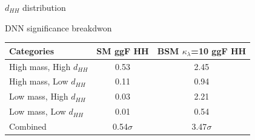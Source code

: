 \begin{frame}{$d_{HH}$ distribution}
\begin{figure}
    \centering
\end{figure}    
\end{frame}

\begin{frame}{DNN significance breakdwon}
\begin{table}[htbp]
    \centering
    \begin{tabular}{lcc}
        \hline\hline
        Categories & SM ggF HH & BSM $\kappa_\lambda$=10 ggF HH \\
        \hline
        High mass, High $d_{HH}$ & 0.53 & 2.45 \\
        High mass, Low $d_{HH}$ & 0.11 & 0.94 \\
        Low mass, High $d_{HH}$ & 0.03 & 2.21 \\
        Low mass, Low $d_{HH}$ & 0.01 & 0.54 \\
        \hline
        Combined & 0.54$\sigma$ & 3.47$\sigma$ \\
        \hline
        \hline
    \end{tabular}
\end{table}
\end{frame}

